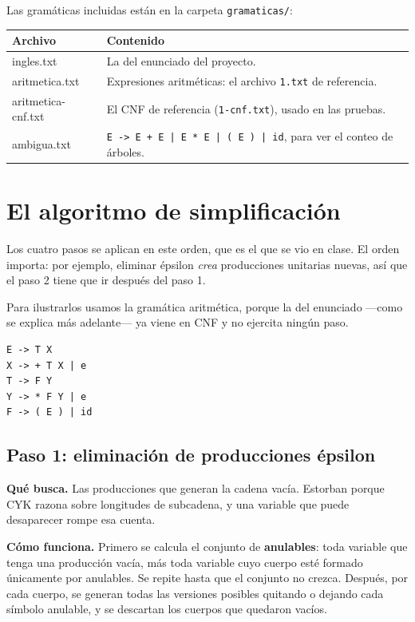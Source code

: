 \documentclass[11pt,a4paper]{article}
\begin{document}
Las gramáticas incluidas están en la carpeta \texttt{gramaticas/}:

\begin{center}
\begin{tabular}{@{}>{\ttfamily}l p{8.5cm}@{}}
\toprule
\textrm{\textbf{Archivo}} & \textbf{Contenido} \\
\midrule
ingles.txt          & La del enunciado del proyecto. \\
aritmetica.txt      & Expresiones aritméticas: el archivo \texttt{1.txt} de referencia. \\
aritmetica-cnf.txt  & El CNF de referencia (\texttt{1-cnf.txt}), usado en las pruebas. \\
ambigua.txt         & \texttt{E -> E + E | E * E | ( E ) | id}, para ver el conteo de árboles. \\
\bottomrule
\end{tabular}
\end{center}

\section{El algoritmo de simplificación}

Los cuatro pasos se aplican en este orden, que es el que se vio en clase.
El orden importa: por ejemplo, eliminar épsilon \emph{crea} producciones
unitarias nuevas, así que el paso 2 tiene que ir después del paso 1.

Para ilustrarlos usamos la gramática aritmética, porque la del enunciado
—como se explica más adelante— ya viene en CNF y no ejercita ningún paso.

\begin{lstlisting}
E -> T X
X -> + T X | e
T -> F Y
Y -> * F Y | e
F -> ( E ) | id
\end{lstlisting}

\subsection{Paso 1: eliminación de producciones épsilon}

\textbf{Qué busca.} Las producciones que generan la cadena vacía. Estorban
porque CYK razona sobre longitudes de subcadena, y una variable que puede
desaparecer rompe esa cuenta.

\textbf{Cómo funciona.} Primero se calcula el conjunto de \textbf{anulables}:
toda variable que tenga una producción vacía, más toda variable cuyo cuerpo
esté formado únicamente por anulables. Se repite hasta que el conjunto no
crezca. Después, por cada cuerpo, se generan todas las versiones posibles
quitando o dejando cada símbolo anulable, y se descartan los cuerpos que
quedaron vacíos.
\end{document}
